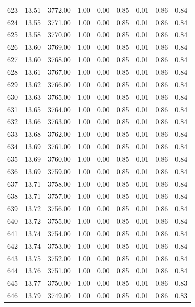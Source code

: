 \documentclass{article}\usepackage[]{graphicx}\usepackage[]{color}
\begin{document}
\begin{longtable}{rrrrrrrrr}
  623 & 13.51 & 3772.00 & 1.00 & 0.00 & 0.85 & 0.01 & 0.86 & 0.84 \\ 
  624 & 13.55 & 3771.00 & 1.00 & 0.00 & 0.85 & 0.01 & 0.86 & 0.84 \\ 
  625 & 13.58 & 3770.00 & 1.00 & 0.00 & 0.85 & 0.01 & 0.86 & 0.84 \\ 
  626 & 13.60 & 3769.00 & 1.00 & 0.00 & 0.85 & 0.01 & 0.86 & 0.84 \\ 
  627 & 13.60 & 3768.00 & 1.00 & 0.00 & 0.85 & 0.01 & 0.86 & 0.84 \\ 
  628 & 13.61 & 3767.00 & 1.00 & 0.00 & 0.85 & 0.01 & 0.86 & 0.84 \\ 
  629 & 13.62 & 3766.00 & 1.00 & 0.00 & 0.85 & 0.01 & 0.86 & 0.84 \\ 
  630 & 13.63 & 3765.00 & 1.00 & 0.00 & 0.85 & 0.01 & 0.86 & 0.84 \\ 
  631 & 13.65 & 3764.00 & 1.00 & 0.00 & 0.85 & 0.01 & 0.86 & 0.84 \\ 
  632 & 13.66 & 3763.00 & 1.00 & 0.00 & 0.85 & 0.01 & 0.86 & 0.84 \\ 
  633 & 13.68 & 3762.00 & 1.00 & 0.00 & 0.85 & 0.01 & 0.86 & 0.84 \\ 
  634 & 13.69 & 3761.00 & 1.00 & 0.00 & 0.85 & 0.01 & 0.86 & 0.84 \\ 
  635 & 13.69 & 3760.00 & 1.00 & 0.00 & 0.85 & 0.01 & 0.86 & 0.84 \\ 
  636 & 13.69 & 3759.00 & 1.00 & 0.00 & 0.85 & 0.01 & 0.86 & 0.84 \\ 
  637 & 13.71 & 3758.00 & 1.00 & 0.00 & 0.85 & 0.01 & 0.86 & 0.84 \\ 
  638 & 13.71 & 3757.00 & 1.00 & 0.00 & 0.85 & 0.01 & 0.86 & 0.84 \\ 
  639 & 13.72 & 3756.00 & 1.00 & 0.00 & 0.85 & 0.01 & 0.86 & 0.84 \\ 
  640 & 13.72 & 3755.00 & 1.00 & 0.00 & 0.85 & 0.01 & 0.86 & 0.84 \\ 
  641 & 13.74 & 3754.00 & 1.00 & 0.00 & 0.85 & 0.01 & 0.86 & 0.84 \\ 
  642 & 13.74 & 3753.00 & 1.00 & 0.00 & 0.85 & 0.01 & 0.86 & 0.84 \\ 
  643 & 13.75 & 3752.00 & 1.00 & 0.00 & 0.85 & 0.01 & 0.86 & 0.84 \\ 
  644 & 13.76 & 3751.00 & 1.00 & 0.00 & 0.85 & 0.01 & 0.86 & 0.84 \\ 
  645 & 13.77 & 3750.00 & 1.00 & 0.00 & 0.85 & 0.01 & 0.86 & 0.83 \\ 
  646 & 13.79 & 3749.00 & 1.00 & 0.00 & 0.85 & 0.01 & 0.86 & 0.83 \\ 

\end{longtable}
\end{document}
